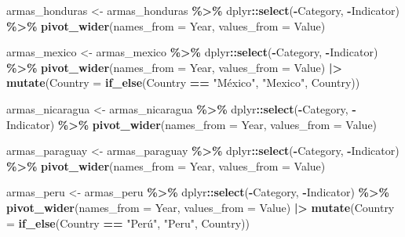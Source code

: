 \documentclass[
  11pt,
]{article}
\newenvironment{Shaded}{\begin{snugshade}}{\end{snugshade}}
\newcommand{\AttributeTok}[1]{\textcolor[rgb]{0.13,0.29,0.53}{#1}}
\newcommand{\FunctionTok}[1]{\textcolor[rgb]{0.13,0.29,0.53}{\textbf{#1}}}
\newcommand{\NormalTok}[1]{#1}
\newcommand{\OtherTok}[1]{\textcolor[rgb]{0.56,0.35,0.01}{#1}}
\newcommand{\SpecialCharTok}[1]{\textcolor[rgb]{0.81,0.36,0.00}{\textbf{#1}}}
\newcommand{\StringTok}[1]{\textcolor[rgb]{0.31,0.60,0.02}{#1}}
\begin{document}
\begin{Shaded}
\begin{Highlighting}[]
\NormalTok{armas\_honduras }\OtherTok{\textless{}{-}}\NormalTok{ armas\_honduras }\SpecialCharTok{\%\textgreater{}\%}
\NormalTok{  dplyr}\SpecialCharTok{::}\FunctionTok{select}\NormalTok{(}\SpecialCharTok{{-}}\NormalTok{Category, }\SpecialCharTok{{-}}\NormalTok{Indicator) }\SpecialCharTok{\%\textgreater{}\%}
  \FunctionTok{pivot\_wider}\NormalTok{(}\AttributeTok{names\_from =}\NormalTok{ Year, }\AttributeTok{values\_from =}\NormalTok{ Value)}

\NormalTok{armas\_mexico }\OtherTok{\textless{}{-}}\NormalTok{ armas\_mexico }\SpecialCharTok{\%\textgreater{}\%}
\NormalTok{  dplyr}\SpecialCharTok{::}\FunctionTok{select}\NormalTok{(}\SpecialCharTok{{-}}\NormalTok{Category, }\SpecialCharTok{{-}}\NormalTok{Indicator) }\SpecialCharTok{\%\textgreater{}\%}
  \FunctionTok{pivot\_wider}\NormalTok{(}\AttributeTok{names\_from =}\NormalTok{ Year, }\AttributeTok{values\_from =}\NormalTok{ Value) }\SpecialCharTok{|\textgreater{}}
  \FunctionTok{mutate}\NormalTok{(}\AttributeTok{Country =} \FunctionTok{if\_else}\NormalTok{(Country }\SpecialCharTok{==} \StringTok{"México"}\NormalTok{, }\StringTok{"Mexico"}\NormalTok{, Country))}

\NormalTok{armas\_nicaragua }\OtherTok{\textless{}{-}}\NormalTok{ armas\_nicaragua }\SpecialCharTok{\%\textgreater{}\%}
\NormalTok{  dplyr}\SpecialCharTok{::}\FunctionTok{select}\NormalTok{(}\SpecialCharTok{{-}}\NormalTok{Category, }\SpecialCharTok{{-}}\NormalTok{Indicator) }\SpecialCharTok{\%\textgreater{}\%}
  \FunctionTok{pivot\_wider}\NormalTok{(}\AttributeTok{names\_from =}\NormalTok{ Year, }\AttributeTok{values\_from =}\NormalTok{ Value)}

\NormalTok{armas\_paraguay }\OtherTok{\textless{}{-}}\NormalTok{ armas\_paraguay }\SpecialCharTok{\%\textgreater{}\%}
\NormalTok{  dplyr}\SpecialCharTok{::}\FunctionTok{select}\NormalTok{(}\SpecialCharTok{{-}}\NormalTok{Category, }\SpecialCharTok{{-}}\NormalTok{Indicator) }\SpecialCharTok{\%\textgreater{}\%}
  \FunctionTok{pivot\_wider}\NormalTok{(}\AttributeTok{names\_from =}\NormalTok{ Year, }\AttributeTok{values\_from =}\NormalTok{ Value)}

\NormalTok{armas\_peru }\OtherTok{\textless{}{-}}\NormalTok{ armas\_peru }\SpecialCharTok{\%\textgreater{}\%}
\NormalTok{  dplyr}\SpecialCharTok{::}\FunctionTok{select}\NormalTok{(}\SpecialCharTok{{-}}\NormalTok{Category, }\SpecialCharTok{{-}}\NormalTok{Indicator) }\SpecialCharTok{\%\textgreater{}\%}
  \FunctionTok{pivot\_wider}\NormalTok{(}\AttributeTok{names\_from =}\NormalTok{ Year, }\AttributeTok{values\_from =}\NormalTok{ Value) }\SpecialCharTok{|\textgreater{}}
  \FunctionTok{mutate}\NormalTok{(}\AttributeTok{Country =} \FunctionTok{if\_else}\NormalTok{(Country }\SpecialCharTok{==} \StringTok{"Perú"}\NormalTok{, }\StringTok{"Peru"}\NormalTok{, Country))}


\end{Highlighting}
\end{Shaded}
\end{document}
